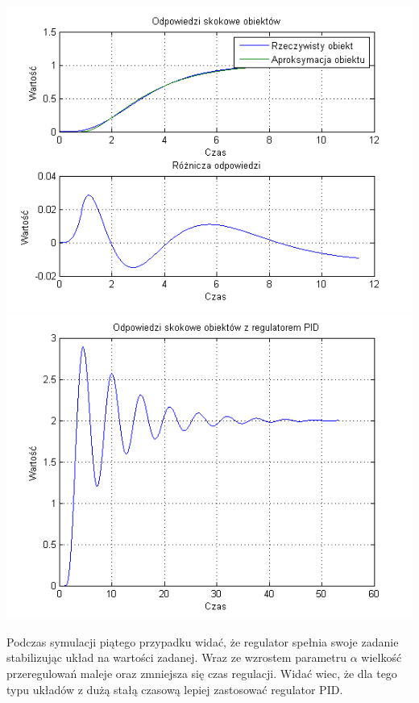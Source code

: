 \documentclass[10pt,a4paper]{article}
\begin{document}
\begin{center}
\includegraphics[scale=1]{images/dwa/skrypt_133.png}\\
\includegraphics[scale=1]{images/dwa/skrypt_134.png}\\
\end{center}
\newpage
Podczas symulacji piątego przypadku widać, że regulator spełnia swoje zadanie stabilizując układ na wartości zadanej. Wraz ze wzrostem parametru $\alpha$ wielkość przeregulowań maleje oraz zmniejsza się czas regulacji. Widać wiec, że dla tego typu układów z dużą stałą czasową lepiej zastosować regulator PID.
\newpage
\end{document}
